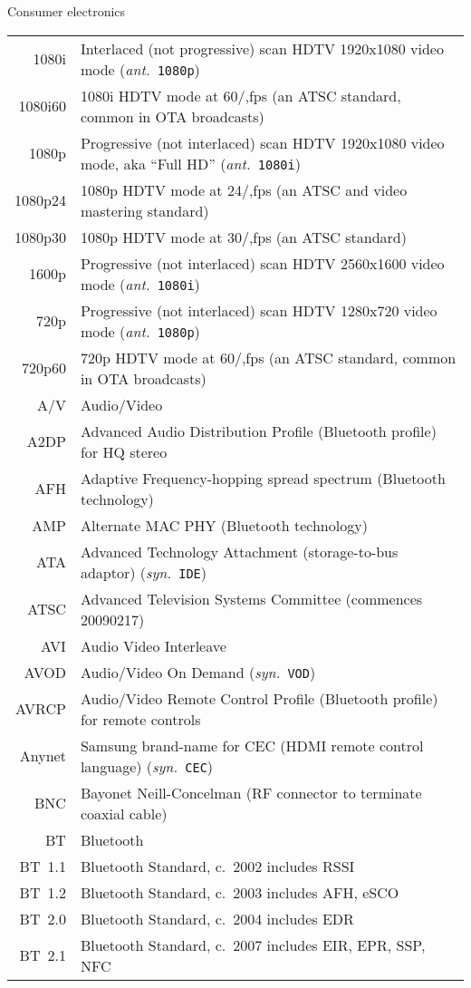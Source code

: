 \documentclass[12pt,twoside]{article}
\newcommand{\ant}[1]{(\textit{ant.}~\texttt{#1})}
\newcommand{\syn}[1]{(\textit{syn.}~\texttt{#1})}
\begin{document}
Consumer electronics
\begin{longtable}[>{\bfseries}l]{>{\ttfamily}r l}
1080i & Interlaced (not progressive) scan HDTV 1920x1080 video mode \ant{1080p} \\
1080i60 & 1080i HDTV mode at 60/,fps (an ATSC standard, common in OTA broadcasts) \\
1080p & Progressive (not interlaced) scan HDTV 1920x1080 video mode, aka ``Full HD'' \ant{1080i} \\
1080p24 & 1080p HDTV mode at 24/,fps (an ATSC and video mastering standard) \\
1080p30 & 1080p HDTV mode at 30/,fps (an ATSC standard) \\
1600p & Progressive (not interlaced) scan HDTV 2560x1600 video mode \ant{1080i} \\
720p & Progressive (not interlaced) scan HDTV 1280x720 video mode \ant{1080p} \\
720p60 & 720p HDTV mode at 60/,fps (an ATSC standard, common in OTA broadcasts) \\
A/V & Audio/Video \\
A2DP & Advanced Audio Distribution Profile (Bluetooth profile) for HQ stereo \\
AFH & Adaptive Frequency-hopping spread spectrum (Bluetooth technology) \\
AMP & Alternate MAC PHY (Bluetooth technology) \\
ATA & Advanced Technology Attachment (storage-to-bus adaptor) \syn{IDE} \\
ATSC & Advanced Television Systems Committee (commences 20090217) \\
AVI & Audio Video Interleave \\
AVOD & Audio/Video On Demand \syn{VOD} \\
AVRCP & Audio/Video Remote Control Profile (Bluetooth profile) for remote controls \\
Anynet & Samsung brand-name for CEC (HDMI remote control language) \syn{CEC} \\
BNC & Bayonet Neill-Concelman (RF connector to terminate coaxial cable) \\
BT & Bluetooth \\
BT~1.1 & Bluetooth Standard, c.~2002 includes RSSI \\
BT~1.2 & Bluetooth Standard, c.~2003 includes AFH, eSCO \\
BT~2.0 & Bluetooth Standard, c.~2004 includes EDR \\
BT~2.1 & Bluetooth Standard, c.~2007 includes EIR, EPR, SSP, NFC \\

\end{longtable}
\end{document}
